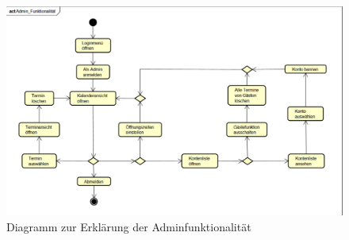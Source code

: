 \begin{figure}[ht]
    \centering
    \includegraphics[width=\textwidth]{figures/activity/adminfunk}
    \caption{Diagramm zur Erklärung der Adminfunktionalität}
    \label{fig:admin-functions-diagram}
\end{figure}
\clearpage
